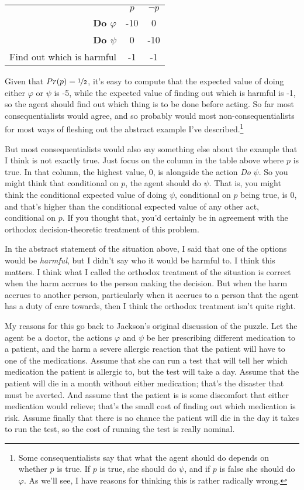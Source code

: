 \documentclass[11pt,oneside]{book}
\begin{document}
\begin{center}
\begin{tabular}{r c c}
 & \(p\) & \(\neg p\) \\
\textbf{Do \(\varphi\)} & -10 & 0 \\
\textbf{Do \(\psi\)} & 0 & -10 \\
Find out which is harmful & -1 & -1 \\
\end{tabular}
\end{center}

\noindent Given that \(Pr(p) = \nicefrac{1}{2}\), it's easy to compute that the expected value of doing either \(\varphi\) or \(\psi\) is -5, while the expected value of finding out which is harmful is -1, so the agent should find out which thing is to be done before acting. So far most consequentialists would agree, and so probably would most non-consequentialists for most ways of fleshing out the abstract example I've described.\footnote{Some consequentialists say that what the agent should do depends on whether \(p\) is true. If \(p\) is true, she should do \(\psi\), and if \(p\) is false she should do \(\varphi\). As we'll see, I have reasons for thinking this is rather radically wrong.}

But most consequentialists would also say something else about the example that I think is not exactly true. Just focus on the column in the table above where \(p\) is true. In that column, the highest value, 0, is alongside the action \textit{Do} \(\psi\). So you might think that conditional on \(p\), the agent should do \(\psi\). That is, you might think the conditional expected value of doing \(\psi\), conditional on \(p\) being true, is 0, and that's higher than the conditional expected value of any other act, conditional on \(p\). If you thought that, you'd certainly be in agreement with the orthodox decision-theoretic treatment of this problem.

In the abstract statement of the situation above, I said that one of the options would be \textit{harmful}, but I didn't say who it would be harmful to. I think this matters. I think what I called the orthodox treatment of the situation is correct when the harm accrues to the person making the decision. But when the harm accrues to another person, particularly when it accrues to a person that the agent has a duty of care towards, then I think the orthodox treatment isn't quite right.

My reasons for this go back to Jackson's original discussion of the puzzle. Let the agent be a doctor, the actions \(\varphi\) and \(\psi\) be her prescribing different medication to a patient, and the harm a severe allergic reaction that the patient will have to one of the medications. Assume that she can run a test that will tell her which medication the patient is allergic to, but the test will take a day. Assume that the patient will die in a month without either medication; that's the disaster that must be averted. And assume that the patient is is some discomfort that either medication would relieve; that's the small cost of finding out which medication is risk. Assume finally that there is no chance the patient will die in the day it takes to run the test, so the cost of running the test is really nominal.
\end{document}
